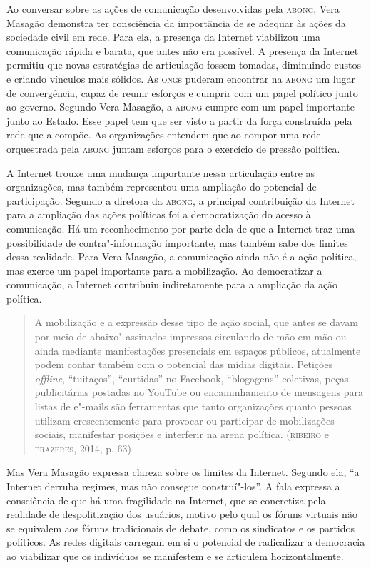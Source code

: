 Ao conversar sobre as ações de comunicação desenvolvidas pela \textsc{abong},
Vera Masagão demonstra ter consciência da importância de se adequar às
ações da sociedade civil em rede. Para ela, a presença da Internet
viabilizou uma comunicação rápida e barata, que antes não era possível.
A presença da Internet permitiu que novas estratégias de articulação
fossem tomadas, diminuindo custos e criando vínculos mais sólidos. As
\textsc{ong}s puderam encontrar na \textsc{abong} um lugar de convergência, capaz de
reunir esforços e cumprir com um papel político junto ao governo.
Segundo Vera Masagão, a \textsc{abong} cumpre com um papel importante junto ao
Estado. Esse papel tem que ser visto a partir da força construída pela
rede que a compõe. As organizações entendem que ao compor uma rede
orquestrada pela \textsc{abong} juntam esforços para o exercício de pressão
política.

A Internet trouxe uma mudança importante nessa articulação entre as
organizações, mas também representou uma ampliação do potencial de
participação. Segundo a diretora da \textsc{abong}, a principal contribuição da
Internet para a ampliação das ações políticas foi a democratização do
acesso à comunicação. Há um reconhecimento por parte dela de que a
Internet traz uma possibilidade de contra"-informação importante, mas
também sabe dos limites dessa realidade. Para Vera Masagão, a
comunicação ainda não é a ação política, mas exerce um papel importante
para a mobilização. Ao democratizar a comunicação, a Internet contribuiu
indiretamente para a ampliação da ação política.

\begin{quote}
A mobilização e a expressão desse tipo de ação social, que antes se
davam por meio de abaixo"-assinados impressos circulando de mão em mão ou
ainda mediante manifestações presenciais em espaços públicos, atualmente
podem contar também com o potencial das mídias digitais. Petições
\emph{offline}, ``tuitaços'', ``curtidas'' no Facebook, ``blogagens''
coletivas, peças publicitárias postadas no YouTube ou encaminhamento de
mensagens para listas de e"-mails são ferramentas que tanto organizações
quanto pessoas utilizam crescentemente para provocar ou participar de
mobilizações sociais, manifestar posições e interferir na arena
política. (\textsc{ribeiro} e \textsc{prazeres}, 2014, p. 63)
\end{quote}

Mas Vera Masagão expressa clareza sobre os limites da Internet. Segundo
ela, ``a Internet derruba regimes, mas não consegue construí"-los''. A
fala expressa a consciência de que há uma fragilidade na Internet, que
se concretiza pela realidade de despolitização dos usuários, motivo pelo
qual os fóruns virtuais não se equivalem aos fóruns tradicionais de
debate, como os sindicatos e os partidos políticos. As redes digitais
carregam em si o potencial de radicalizar a democracia ao viabilizar que
os indivíduos se manifestem e se articulem horizontalmente.

